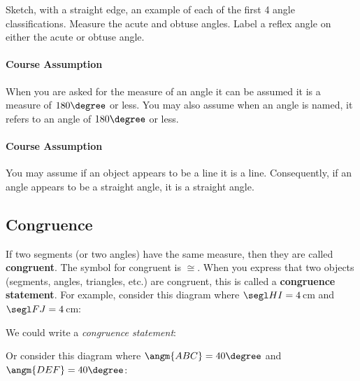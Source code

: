 \noindent \q Sketch, with a straight edge, an example of each of the first 4 angle classifications.  Measure the acute and obtuse angles.  Label a reflex angle on either the acute or obtuse angle.

\vfill


\paragraph{Course Assumption}
When you are asked for the measure of an angle it can be assumed it is a measure of $180\degree$ or less.  You may also assume when an angle is named, it refers to an angle of $180\degree$ or less.

\paragraph{Course Assumption}
You may assume if an object appears to be a line it is a line.  Consequently, if an angle appears to be a straight angle, it is a straight angle.

\subsection{Congruence}
If two segments (or two angles) have the same measure, then they are called \textbf{congruent}.  The symbol for congruent is $\cong$.  When you express that two objects (segments, angles, triangles, etc.) are congruent, this is called a \textbf{congruence statement}.  For example, consider this diagram where $\segl HI = 4$\,cm and $\segl FJ = 4$\,cm:

	\begin{center}
	\end{center}

\noindent We could write a \emph{congruence statement}:  

\newpage

\noindent Or consider this diagram where $\angm{ABC} =40\degree$ and $\angm {DEF}=40\degree$:

